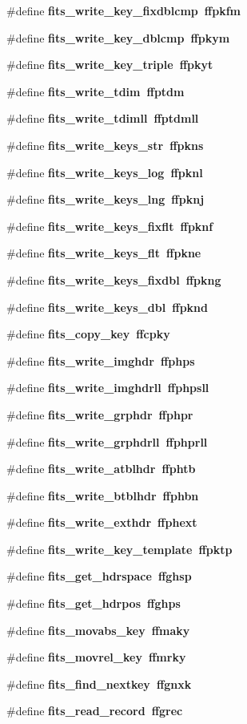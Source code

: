 \begin{CompactItemize}
\item 
\#define \bf{fits\_\-write\_\-key\_\-fixdblcmp}~ffpkfm
\item 
\#define \bf{fits\_\-write\_\-key\_\-dblcmp}~ffpkym
\item 
\#define \bf{fits\_\-write\_\-key\_\-triple}~ffpkyt
\item 
\#define \bf{fits\_\-write\_\-tdim}~ffptdm
\item 
\#define \bf{fits\_\-write\_\-tdimll}~ffptdmll
\item 
\#define \bf{fits\_\-write\_\-keys\_\-str}~ffpkns
\item 
\#define \bf{fits\_\-write\_\-keys\_\-log}~ffpknl
\item 
\#define \bf{fits\_\-write\_\-keys\_\-lng}~ffpknj
\item 
\#define \bf{fits\_\-write\_\-keys\_\-fixflt}~ffpknf
\item 
\#define \bf{fits\_\-write\_\-keys\_\-flt}~ffpkne
\item 
\#define \bf{fits\_\-write\_\-keys\_\-fixdbl}~ffpkng
\item 
\#define \bf{fits\_\-write\_\-keys\_\-dbl}~ffpknd
\item 
\#define \bf{fits\_\-copy\_\-key}~ffcpky
\item 
\#define \bf{fits\_\-write\_\-imghdr}~ffphps
\item 
\#define \bf{fits\_\-write\_\-imghdrll}~ffphpsll
\item 
\#define \bf{fits\_\-write\_\-grphdr}~ffphpr
\item 
\#define \bf{fits\_\-write\_\-grphdrll}~ffphprll
\item 
\#define \bf{fits\_\-write\_\-atblhdr}~ffphtb
\item 
\#define \bf{fits\_\-write\_\-btblhdr}~ffphbn
\item 
\#define \bf{fits\_\-write\_\-exthdr}~ffphext
\item 
\#define \bf{fits\_\-write\_\-key\_\-template}~ffpktp
\item 
\#define \bf{fits\_\-get\_\-hdrspace}~ffghsp
\item 
\#define \bf{fits\_\-get\_\-hdrpos}~ffghps
\item 
\#define \bf{fits\_\-movabs\_\-key}~ffmaky
\item 
\#define \bf{fits\_\-movrel\_\-key}~ffmrky
\item 
\#define \bf{fits\_\-find\_\-nextkey}~ffgnxk
\item 
\#define \bf{fits\_\-read\_\-record}~ffgrec
\item 

\end{CompactItemize}
